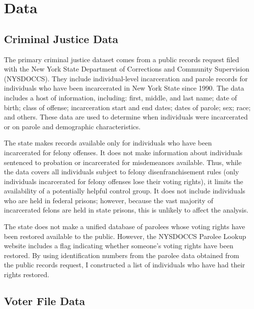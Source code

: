 \documentclass[12pt,]{article}
\begin{document}
\hypertarget{data}{%
\section{Data}\label{data}}

\hypertarget{criminal-justice-data}{%
\subsection*{Criminal Justice Data}\label{criminal-justice-data}}

The primary criminal justice dataset comes from a public records request filed with the New York State Department of Corrections and Community Supervision (NYSDOCCS). They include individual-level incarceration and parole records for individuals who have been incarcerated in New York State since 1990. The data includes a host of information, including: first, middle, and last name; date of birth; class of offense; incarceration start and end dates; dates of parole; sex; race; and others. These data are used to determine when individuals were incarcerated or on parole and demographic characteristics.

The state makes records available only for individuals who have been incarcerated for felony offenses. It does not make information about individuals sentenced to probation or incarcerated for misdemeanors available. Thus, while the data covers all individuals subject to felony disenfranchisement rules (only individuals incarcerated for felony offenses lose their voting rights), it limits the availability of a potentially helpful control group. It does not include individuals who are held in federal prisons; however, because the vast majority of incarcerated felons are held in state prisons, this is unlikely to affect the analysis.

The state does not make a unified database of parolees whose voting rights have been restored available to the public. However, the NYSDOCCS Parolee Lookup website includes a flag indicating whether someone's voting rights have been restored. By using identification numbers from the parolee data obtained from the public records request, I constructed a list of individuals who have had their rights restored.

\hypertarget{voter-file-data}{%
\subsection*{Voter File Data}\label{voter-file-data}}
\end{document}
